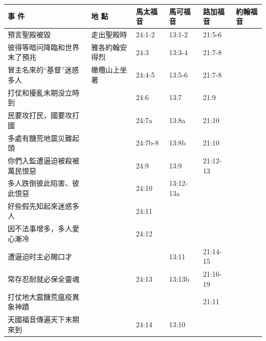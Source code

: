 \begin{table}[H]\centering
\begin{tabular}{p{14em}|p{7.93em}|l|l|l|p{4.855em}}\toprule
 \textbf{事 件} & \textbf{地 點} & \multicolumn{1}{p{5.285em}|}{\textbf{馬太福音}} & \multicolumn{1}{p{5.57em}|}{\textbf{馬可福音}} & \multicolumn{1}{p{5.285em}|}{\textbf{路加福音}} & \textbf{約翰福音} \\  \midrule
預言聖殿被毀&走出聖殿時&24:1-2&13:1-2&21:5-6&  \\\midrule
彼得等暗问降臨和世界末了預兆&雅各約翰安得烈&24:3&13:3-4&21:7-8&  \\\midrule
冒主名來的“基督”迷惑多人&橄欖山上坐著&24:4-5&13:5-6&21:7-8&  \\\midrule
打仗和擾亂末期没立時到& &24:6&13:7 &21:9&  \\\midrule

民要攻打民，國要攻打國&&24:7a&13:8a&21:10&  \\\midrule
多處有饑荒地震災難起頭&&24:7b-8&13:8b&21:10&  \\\midrule

你們入監遭逼迫被殺被萬民恨惡&       &24:9&13:9 &21:12-13&  \\\midrule
多人跌倒彼此陷害、彼此恨惡&       &24:10&13:12-13a&&  \\\midrule
好些假先知起來迷惑多人&       &24:11&       &&  \\\midrule
因不法事增多，多人愛心漸冷&       &24:12&       &&  \\\midrule

遭逼迫时主必賜口才&       &       &13:11&21:14-15&  \\\midrule
常存忍耐就必保全靈魂&       &24:13   &13:13b&21:16-19&  \\\midrule

打仗地大震饑荒瘟疫異象神蹟&       &       &       &21:11&  \\\midrule

天國福音傳遍天下末期來到&       &24:14&13:10&&  \\\midrule
\end{tabular}%
\end{table}






